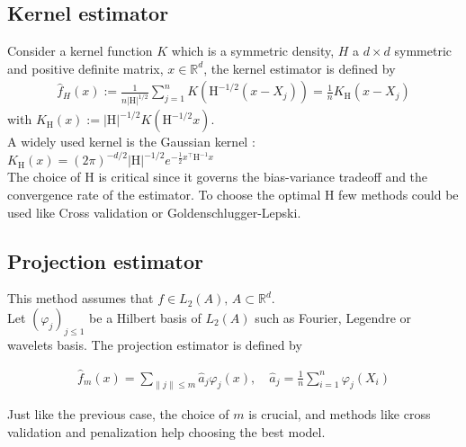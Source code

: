 \documentclass{article}
\begin{document}
\subsection{Kernel estimator}
Consider a kernel function \(K\) which is a symmetric density, \(H\) a \(d\times d\) symmetric and positive definite matrix, \(x\in\mathbb{R}^d\), the kernel estimator is defined by 
\begin{align}
\hat{f}_H(x):=\frac{1}{n|\mathrm{H}|^{1/2}}\sum_{j=1}^n K\left(\mathrm{H}^{-1/2}(x-X_j)\right)=\frac{1}{n}K_\mathrm{H}\left(x-X_j\right)
\end{align}
with \(K_\mathrm{H}(x):= |\mathrm{H}|^{-1/2}K(\mathrm{H}^{-1/2}x)\). \\
A widely used kernel is the Gaussian kernel : \(K_\textrm{H}(x)=(2\pi)^{-d/2}|\textrm{H}|^{-1/2}e^{-\frac{1}{2} x^\intercal \textrm{H}^{-1} x}\) \\
The choice of \(\mathrm{H}\) is critical since it governs the bias-variance tradeoff and the convergence rate of the estimator. To choose the optimal \(\mathrm{H}\) few methods could be used like Cross validation or Goldenschlugger-Lepski.

\subsection{Projection estimator}
This method assumes that \(f\in L_2(A), \, A\subset \mathbb{R}^d\). \\
Let \((\varphi_j)_{j\le 1}\) be a Hilbert basis of \(L_2(A)\) such as Fourier, Legendre or wavelets basis. The projection estimator is defined by 

\begin{align}
    \hat{f}_m(x)=\sum_{\|j\|\le m} \hat{a}_j\varphi_j(x), \quad \hat{a}_j=\frac{1}{n}\sum_{i=1}^n \varphi_j(X_i)
\end{align}

\begin{comment}
\begin{align}
    \hat{f}_\mathrm{K}=\sum_{k_1=1}^{K_1}\ldots\sum_{k_d=1}^{K_d}\hat{a}_{k_1,\ldots,k_d}\varphi_{k_1,\ldots,k_d}, \quad \hat{a}_{k_1,\ldots,k_d}=\frac{1}{n}\sum_{i=1}^n \varphi_{k_1,\ldots,k_d}(X_i) = \frac{1}{n}\sum_{i=1}^n \prod_{j=1}^d \varphi_{k_j}(X_i)
\end{align}
\end{comment}
Just like the previous case, the choice of \(m\) is crucial, and methods like cross validation and penalization help choosing the best model.

\bigskip

\newpage
\nocite{Coste_2025}
\nocite{lipman2024flowmatchingguidecode}
\nocite{strasman2025analysisnoiseschedulescorebased}
\nocite{battey2014smoothprojecteddensityestimation}
\nocite{dionblanc2025nonparametricdensityestimation}
\nocite{mathieu2024flow}


\end{document}
